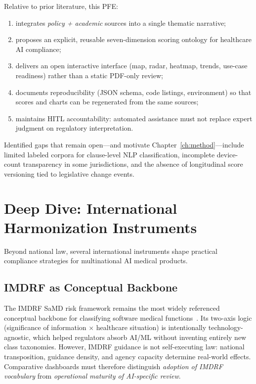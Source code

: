 Relative to prior literature, this PFE:
\begin{enumerate}[noitemsep]
  \item integrates \emph{policy + academic} sources into a single thematic narrative;
  \item proposes an explicit, reusable seven-dimension scoring ontology for healthcare AI compliance;
  \item delivers an open interactive interface (map, radar, heatmap, trends, use-case readiness) rather than a static PDF-only review;
  \item documents reproducibility (JSON schema, code listings, environment) so that scores and charts can be regenerated from the same sources;
  \item maintains HITL accountability: automated assistance must not replace expert judgment on regulatory interpretation.
\end{enumerate}

Identified gaps that remain open---and motivate Chapter~\ref{ch:method}---include limited labeled corpora for clause-level NLP classification, incomplete device-count transparency in some jurisdictions, and the absence of longitudinal score versioning tied to legislative change events.


\section{Deep Dive: International Harmonization Instruments}
\label{sec:harmonization}

Beyond national law, several international instruments shape practical compliance strategies for multinational AI medical products.

\subsection{IMDRF as Conceptual Backbone}
The IMDRF SaMD risk framework remains the most widely referenced conceptual backbone for classifying software medical functions~\cite{imdrf2014}. Its two-axis logic (significance of information $\times$ healthcare situation) is intentionally technology-agnostic, which helped regulators absorb AI/ML without inventing entirely new class taxonomies. However, IMDRF guidance is not self-executing law: national transposition, guidance density, and agency capacity determine real-world effects. Comparative dashboards must therefore distinguish \emph{adoption of IMDRF vocabulary} from \emph{operational maturity of AI-specific review}.

